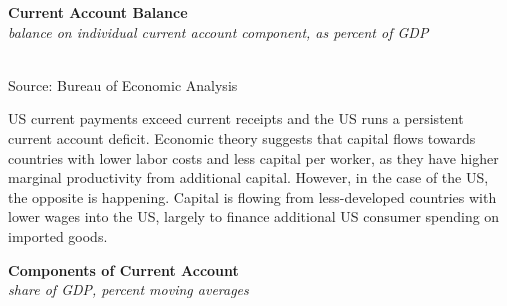 \documentclass{report}
\makeatletter
\newcommand{\tbllink}[1]{\href{https://raw.githubusercontent.com/bdecon/US-chartbook/master/chartbook/data/#1}{\faTable}}
\newcommand*\short[1]{\expandafter\@gobbletwo\number\numexpr#1\relax}
\newcommand{\ctsbar}[5]{
		\addplot[ybar stacked, bar width=#5, draw opacity=0, fill=#1] 
			table [x=#2, y=#3, col sep=comma]{#4};}
\newcommand{\dateaxisticks}{
		date coordinates in=x, axis line style={draw=none},
		xmax={2024-01-31},
		max space between ticks=40,	    
		xtick={{1990-01-01}, {1992-01-01}, {1994-01-01}, 
			{1996-01-01}, {1998-01-01}, {2000-01-01}, 
			{2002-01-01}, {2004-01-01}, {2006-01-01},
			{2008-01-01}, {2010-01-01}, {2012-01-01}, {2014-01-01},
		    {2016-01-01}, {2018-01-01}, {2020-01-01}, {2022-01-01}, 
		    {2024-01-01}, {2026-01-01}},
		minor xtick={{1989-01-01}, {1991-01-01}, {1993-01-01},
			{1995-01-01}, {1997-01-01}, {1999-01-01}, 
			{2001-01-01}, {2003-01-01}, {2005-01-01}, {2007-01-01},
		    {2009-01-01}, {2011-01-01}, {2013-01-01}, {2015-01-01},
		    {2017-01-01}, {2019-01-01}, {2021-01-01}, {2023-01-01}, 
		    {2025-01-01}, {2027-01-01}},
		enlarge y limits={0.06}, enlarge x limits={0.01},
		xticklabel style={align=center, yshift=-2pt}, tick label style={inner sep=0pt},
		}
\newcommand{\bbar}[2]{extra #1 ticks = {{#2}}, extra #1 tick labels = ,
		extra #1 tick style = {grid=major, grid style={thick, black!25}},}
\newcommand{\stdline}[4]{\addplot[very thick, no markers, color=#1] 
		table [x=#2, y=#3, col sep=comma] {#4};	}
\newcommand{\rbars}{
		\fill[color=black!10] (axis cs:{1990-07-01},\pgfkeysvalueof{/pgfplots/ymin})
			rectangle (axis cs:{1991-03-01}, \pgfkeysvalueof{/pgfplots/ymax});
		\fill[color=black!10] (axis cs:{2007-12-01},\pgfkeysvalueof{/pgfplots/ymin})
			rectangle (axis cs:{2009-07-01}, \pgfkeysvalueof{/pgfplots/ymax});
		\fill[color=black!10] (axis cs:{2001-03-01},\pgfkeysvalueof{/pgfplots/ymin})
			rectangle (axis cs:{2001-11-01}, \pgfkeysvalueof{/pgfplots/ymax});
		\fill[color=black!10] (axis cs:{2020-02-01},\pgfkeysvalueof{/pgfplots/ymin})
			rectangle (axis cs:{2020-05-01}, \pgfkeysvalueof{/pgfplots/ymax});}
\makeatother
\begin{document}
{\begin{minipage}{1.0\textwidth}
\normalsize \textbf{Current Account Balance}\\
\footnotesize{\textit{balance on individual current account component, as percent of GDP}}\\
\hspace*{-2mm} \\
\footnotesize{Source: Bureau of Economic Analysis} \hfill \tbllink{cab.csv}
\vspace{1mm}

\small US current payments exceed current receipts and the US runs a persistent current account deficit. Economic theory suggests that capital flows towards countries with lower labor costs and less capital per worker, as they have higher marginal productivity from additional capital. However, in the case of the US, the opposite is happening. Capital is flowing from less-developed countries with lower wages into the US, largely to finance additional US consumer spending on imported goods. 
\end{minipage}
\newpage
{}
\begin{minipage}{1.0\textwidth}
\normalsize \textbf{Components of Current Account}\\
\footnotesize{\textit{share of GDP, percent \hspace{70mm} moving averages}}\\ 
 \setlength{\tabcolsep}{3.1pt} \color{black!90}
	{\renewcommand{\arraystretch}{1.48}
		\begin{tabular}{p{32mm} R{8mm} R{8mm} R{8mm} R{8mm} R{8mm} 
		   R{8mm} R{9.4mm} R{8.4mm} }
			  \hline
		\end{tabular}}
		

\end{minipage}}
\end{document}
